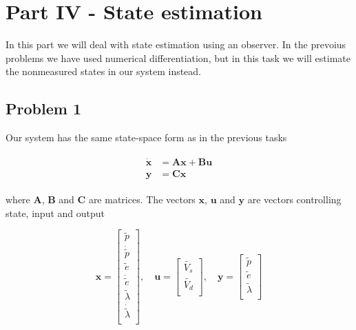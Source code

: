 \section{Part IV - State estimation}
In this part we will deal with state estimation using an observer. In the prevoius problems we have used numerical differentiation, but in this task we will estimate the nonmeasured states in our system instead. 

\subsection{Problem 1}

Our system has the same state-space form as in the previous tasks

\begin{align}
  \begin{split}
    \dot{\bm{x}} &= \bm{Ax} + \bm{Bu} \\
    \bm{y} &= \bm{Cx}
  \end{split}
\end{align}

where \textbf{A}, \textbf{B} and \textbf{C} are matrices. The vectors $\bm{x}$, $\bm{u}$ and $\bm{y}$ are vectors controlling state, input and output

\begin{equation}
  \label{eq:state_space_vectors}
  \bm{x} =
  \begin{bmatrix}
    \tilde{p} \\
    \dot{\tilde{p}} \\
    \tilde{e} \\
    \dot{\tilde{e}} \\
    \tilde{\lambda} \\
    \dot{\tilde{\lambda}} \\
  \end{bmatrix}
  , \quad \bm{u} =
  \begin{bmatrix}
    \tilde{V_s} \\
    \tilde{V_d} \\
  \end{bmatrix} ,
  \quad \bm{y} =
  \begin{bmatrix}
    \tilde{p} \\
    \tilde{e} \\
    \tilde{\lambda}\\
  \end{bmatrix}
\end{equation}

